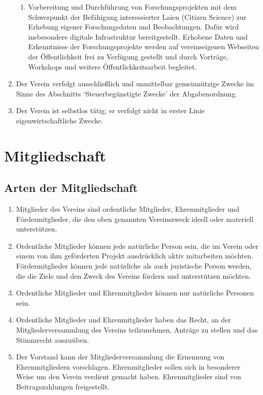 \documentclass[12pt,a4paper,draft]{article}
\begin{document}
\begin{enumerate}
\begin{enumerate}
\item Vorbereitung und Durchführung von Forschungsprojekten mit dem Schwerpunkt der Befähigung interessierter Laien (Citizen Science) zur Erhebung eigener Forschungsdaten und Beobachtungen. Dafür wird insbesondere digitale Infrastruktur bereitgestellt. Erhobene Daten und Erkenntnisse der Forschungsprojekte werden auf vereinseigenen Webseiten der Öffentlichkeit frei zu Verfügung gestellt und durch Vorträge, Workshops und weitere Öffentlichkeitsarbeit begleitet.

\end{enumerate}

\item Der Verein verfolgt ausschließlich und unmittelbar gemeinnützige Zwecke 
im Sinne des Abschnitts `Steuerbegünstigte Zwecke' der Abgabenordnung.

\item Der Verein ist selbstlos tätig; er verfolgt nicht in erster Linie 
eigenwirtschaftliche Zwecke.
\end{enumerate}

\section{Mitgliedschaft}
\subsection{Arten der Mitgliedschaft}
\begin{enumerate}
\item Mitglieder des Vereins sind ordentliche Mitglieder, Ehrenmitglieder und 
Fördermitglieder, die den oben genannten Vereinszweck ideell oder materiell 
unterstützen.

\item Ordentliche Mitglieder können jede natürliche Person sein,  die im Verein oder einem von
ihm geförderten Projekt ausdrücklich aktiv mitarbeiten möchten. Fördermitglieder können jede natürliche
als auch juristische Person werden, die die Ziele und den
Zweck des Vereins fördern und unterstützen möchten.

\item Ordentliche Mitglieder und Ehrenmitglieder können nur natürliche Personen 
sein.

\item Ordentliche Mitglieder und Ehrenmitglieder haben das Recht, an der 
Mitgliederversammlung des Vereins teilzunehmen, Anträge zu stellen und das 
Stimmrecht auszuüben.

\item Der Vorstand kann der Mitgliederversammlung die Ernennung von 
Ehrenmitgliedern vorschlagen.  Ehrenmitglieder sollen sich in besonderer Weise um den Verein verdient gemacht haben. Ehrenmitglieder sind von Beitragszahlungen 
freigestellt. 
\end{enumerate}
\end{document}
